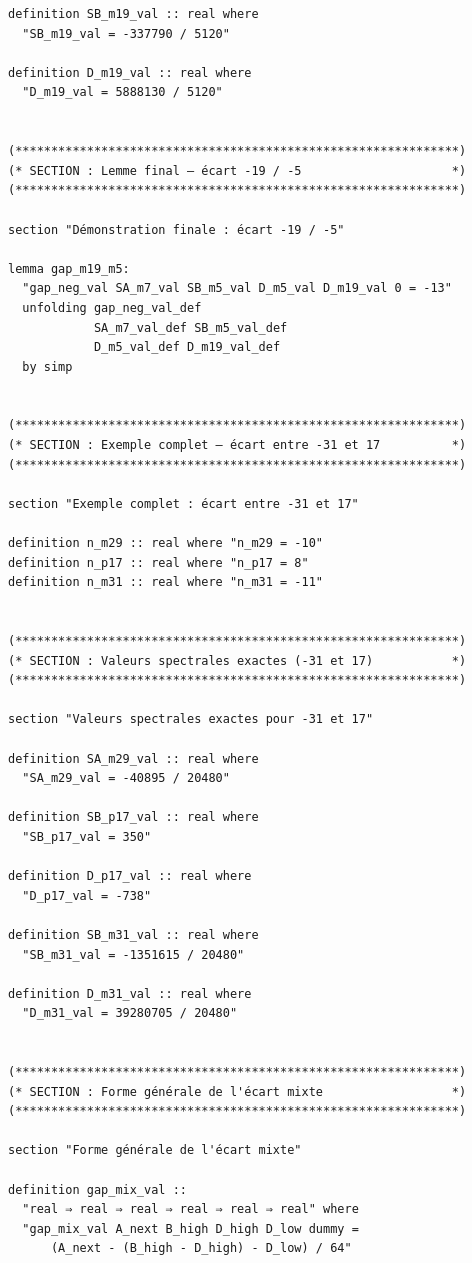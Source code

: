 \documentclass[a4paper,11pt]{article}
\begin{document}
\begin{holcode}[title={\textcolor{white}{Fichier : methode\_spectral.thy -- Partie 1/4}}]
\begin{lstlisting}
definition SB_m19_val :: real where
  "SB_m19_val = -337790 / 5120"

definition D_m19_val :: real where
  "D_m19_val = 5888130 / 5120"


(**************************************************************)
(* SECTION : Lemme final – écart -19 / -5                     *)
(**************************************************************)

section "Démonstration finale : écart -19 / -5"

lemma gap_m19_m5:
  "gap_neg_val SA_m7_val SB_m5_val D_m5_val D_m19_val 0 = -13"
  unfolding gap_neg_val_def
            SA_m7_val_def SB_m5_val_def
            D_m5_val_def D_m19_val_def
  by simp


(**************************************************************)
(* SECTION : Exemple complet – écart entre -31 et 17          *)
(**************************************************************)

section "Exemple complet : écart entre -31 et 17"

definition n_m29 :: real where "n_m29 = -10"
definition n_p17 :: real where "n_p17 = 8"
definition n_m31 :: real where "n_m31 = -11"


(**************************************************************)
(* SECTION : Valeurs spectrales exactes (-31 et 17)           *)
(**************************************************************)

section "Valeurs spectrales exactes pour -31 et 17"

definition SA_m29_val :: real where
  "SA_m29_val = -40895 / 20480"

definition SB_p17_val :: real where
  "SB_p17_val = 350"

definition D_p17_val :: real where
  "D_p17_val = -738"

definition SB_m31_val :: real where
  "SB_m31_val = -1351615 / 20480"

definition D_m31_val :: real where
  "D_m31_val = 39280705 / 20480"


(**************************************************************)
(* SECTION : Forme générale de l'écart mixte                  *)
(**************************************************************)

section "Forme générale de l'écart mixte"

definition gap_mix_val ::
  "real ⇒ real ⇒ real ⇒ real ⇒ real ⇒ real" where
  "gap_mix_val A_next B_high D_high D_low dummy =
      (A_next - (B_high - D_high) - D_low) / 64"



\end{lstlisting}
\end{holcode}
\end{document}
